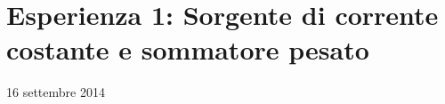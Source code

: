 \section{Esperienza 1: Sorgente di corrente costante e sommatore pesato}
{\small 16 settembre 2014}





